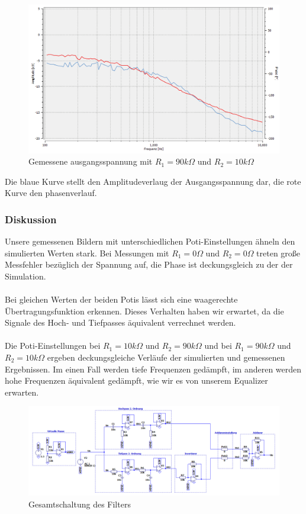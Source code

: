 \newpage
\begin{figure}[htb]
    \includegraphics[width=16cm]{./pictures/Messungen/Gesamtschaltung_Test_90_10}
    \caption{Gemessene ausgangsspannung mit $R_1 = 90k\Omega$ und $R_2 = 10k\Omega$}
    \label{fig:Gesamtschaltung_Test_90_10}
\end{figure}

Die blaue Kurve stellt den Amplitudeverlaug der Ausgangsspannung dar, die rote Kurve den phasenverlauf.

\subsubsection{Diskussion}

Unsere gemessenen Bildern mit unterschiedlichen Poti-Einstellungen ähneln den simulierten Werten stark. Bei Messungen mit $R_1 = 0\Omega$ und $R_2 = 0\Omega$ treten große Messfehler bezüglich der Spannung auf, die Phase ist deckungsgleich zu der der Simulation.
\\
\\
Bei gleichen Werten der beiden Potis lässt sich eine waagerechte Übertragungsfunktion erkennen. Dieses Verhalten haben wir erwartet, da die Signale des Hoch- und Tiefpasses äquivalent verrechnet werden.
\\
\\
Die Poti-Einstellungen bei $R_1 = 10k\Omega$ und $R_2 = 90k\Omega$ und bei $R_1 = 90k\Omega$ und $R_2 = 10k\Omega$ ergeben deckungsgleiche Verläufe der simulierten und gemessenen Ergebnissen. Im einen Fall werden tiefe Frequenzen gedämpft, im anderen werden hohe Frequenzen äquivalent gedämpft, wie wir es von unserem Equalizer erwarten.

\newpage
\begin{figure}
    \includegraphics[width=22cm]{./pictures/Schaltung}
    \caption{Gesamtschaltung des Filters}
    \label{fig:Gesamtschaltung}
\end{figure}